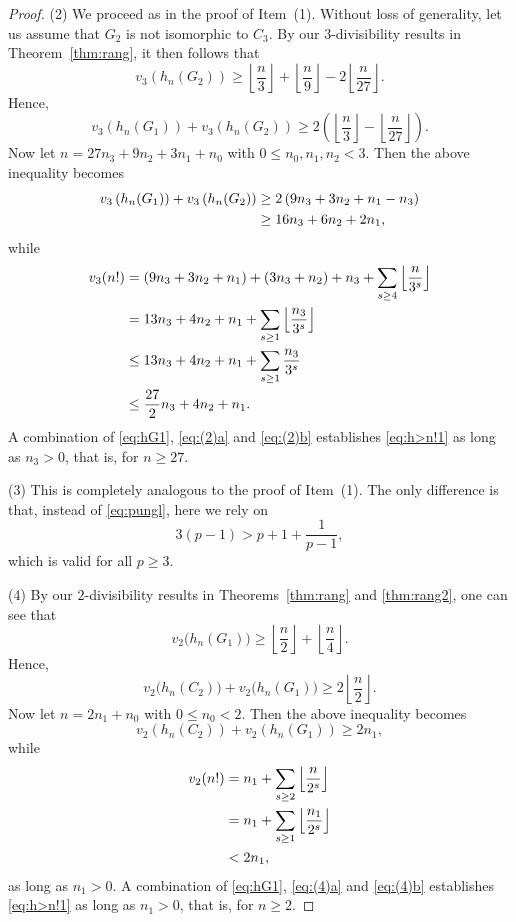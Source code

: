 \documentclass[12pt,reqno]{amsart}
\numberwithin{equation}{section}
\theoremstyle{remark}
\begin{document}
\begin{proof}
\medskip
(2) We proceed as in the proof of Item~(1). Without loss of
generality, let us assume that $G_2$ is not isomorphic to $C_3$.
By our $3$-divisibility results in Theorem~\ref{thm:rang}, it then
follows that
$$
v_3\left(h_n(G_2)\right)\ge 
{\left\lfloor{\frac {n} {3}}\right\rfloor}+{\left\lfloor{\frac {n} {9}}\right\rfloor}-2{\left\lfloor{\frac {n} {27}}\right\rfloor}.
$$
Hence,
\begin{equation*} 
v_3\left(h_n(G_1)\right)+v_3\left(h_n(G_2)\right)
\ge 2\left({\left\lfloor{\frac {n} {3}}\right\rfloor}-{\left\lfloor{\frac {n} {27}}\right\rfloor}\right).
\end{equation*}
Now let $n=27n_3+9n_2+3n_1+n_0$ with $0\le n_0,n_1,n_2<3$.
Then the above inequality becomes
\begin{align} \notag
v_3\left(h_n(G_1)\right)+v_3\left(h_n(G_2)\right)
&\ge 2\left(9n_3+3n_2+n_1-n_3\right)\\
&\ge 16n_3+6n_2+2n_1,
\label{eq:(2)a}  
\end{align}
while
\begin{align} \notag
v_3(n!)&=(9n_3+3n_2+n_1)+(3n_3+n_2)+n_3+\sum_{s\ge4}{\left\lfloor{\frac {n} {3^s}}\right\rfloor}\\
\notag
&=13n_3+4n_2+n_1+\sum_{s\ge1}{\left\lfloor{\frac {n_3} {3^s}}\right\rfloor}\\
\notag
&\le 13n_3+4n_2+n_1+\sum_{s\ge1}{\frac {n_3} {3^s}}\\
&\le \frac {27} {2}n_3+4n_2+n_1.
\label{eq:(2)b}  
\end{align}
A combination of 
\eqref{eq:hG1}, \eqref{eq:(2)a} and
\eqref{eq:(2)b} establishes \eqref{eq:h>n!1} as long as
$n_3>0$, that is, for $n\ge 27$.

\medskip
(3) This is completely analogous to the proof of Item~(1).
The only difference is that, instead of \eqref{eq:pungl},
here we rely on
$$
3(p-1)> p+1+\frac {1} {p-1},
$$
which is valid for all $p\ge3$.

\medskip
(4) 
By our $2$-divisibility results in Theorems~\ref{thm:rang}
and \ref{thm:rang2}, one can see that
$$
v_2\big(h_n(G_1)\big)\ge 
{\left\lfloor{\frac {n} {2}}\right\rfloor}+{\left\lfloor{\frac {n} {4}}\right\rfloor}.
$$
Hence,
\begin{equation*} 
v_2\big(h_n(C_2)\big)+v_2\big(h_n(G_1)\big)
\ge 2{\left\lfloor{\frac {n} {2}}\right\rfloor}.
\end{equation*}
Now let $n=2n_1+n_0$ with $0\le n_0<2$.
Then the above inequality becomes
\begin{equation}  
v_2\left(h_n(C_2)\right)+v_2\left(h_n(G_1)\right)
\ge 2n_1,
\label{eq:(4)a}  
\end{equation}
while
\begin{align} \notag
v_2(n!)&=n_1+\sum_{s\ge2}{\left\lfloor{\frac {n} {2^s}}\right\rfloor}\\
\notag
&=n_1+\sum_{s\ge1}{\left\lfloor{\frac {n_1} {2^s}}\right\rfloor}\\
&< 2n_1,
\label{eq:(4)b}  
\end{align}
as long as $n_1>0$.
A combination of 
\eqref{eq:hG1}, \eqref{eq:(4)a} and
\eqref{eq:(4)b} establishes \eqref{eq:h>n!1} as long as
$n_1>0$, that is, for $n\ge 2$.


\end{proof}
\end{document}
